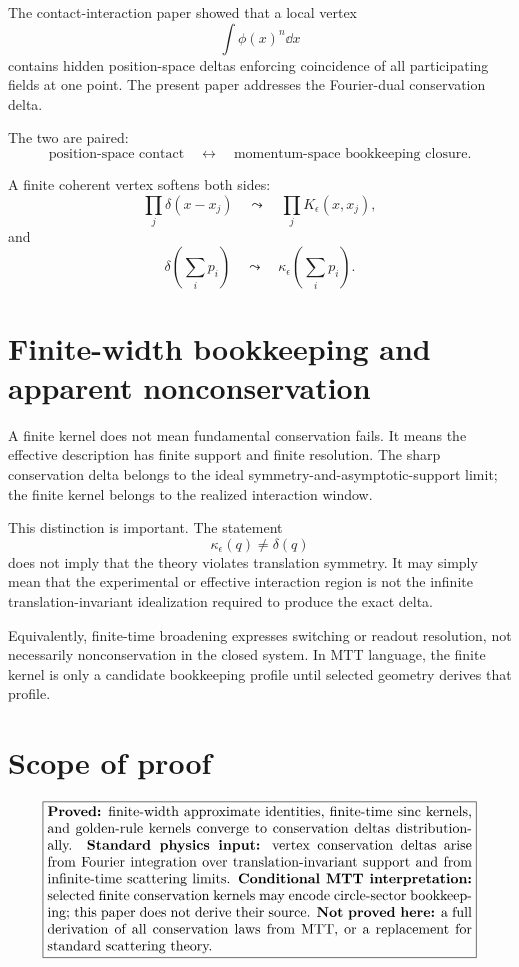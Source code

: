 \documentclass[11pt]{article}
\begin{document}
The contact-interaction paper showed that a local vertex
\[
\int\phi(x)^n\dd x
\]
contains hidden position-space deltas enforcing coincidence of all participating fields at one point.  The present paper addresses the Fourier-dual conservation delta.

The two are paired:
\[
\text{position-space contact}
\quad\longleftrightarrow\quad
\text{momentum-space bookkeeping closure}.
\]

A finite coherent vertex softens both sides:
\[
\prod_j\delta(x-x_j)
\quad\leadsto\quad
\prod_jK_\epsilon(x,x_j),
\]
and
\[
\delta\!\left(\sum_i p_i\right)
\quad\leadsto\quad
\kappa_\epsilon\!\left(\sum_i p_i\right).
\]

\section{Finite-width bookkeeping and apparent nonconservation}

A finite kernel does not mean fundamental conservation fails.  It means the effective description has finite support and finite resolution.  The sharp conservation delta belongs to the ideal symmetry-and-asymptotic-support limit; the finite kernel belongs to the realized interaction window.

This distinction is important.  The statement
\[
\kappa_\epsilon(q)\neq\delta(q)
\]
does not imply that the theory violates translation symmetry.  It may simply mean that the experimental or effective interaction region is not the infinite translation-invariant idealization required to produce the exact delta.

Equivalently, finite-time broadening expresses switching or readout resolution, not necessarily
nonconservation in the closed system.  In MTT language, the finite kernel is only a candidate
bookkeeping profile until selected geometry derives that profile.

\section{Scope of proof}

\[
\boxed{
\begin{minipage}{0.88\linewidth}
\textbf{Proved:} finite-width approximate identities, finite-time sinc kernels, and golden-rule kernels converge to conservation deltas distributionally.

\textbf{Standard physics input:} vertex conservation deltas arise from Fourier integration over translation-invariant support and from infinite-time scattering limits.

\textbf{Conditional MTT interpretation:} selected finite conservation kernels may encode
circle-sector bookkeeping; this paper does not derive their source.

\textbf{Not proved here:} a full derivation of all conservation laws from MTT, or a replacement for standard scattering theory.
\end{minipage}
}
\]
\end{document}
